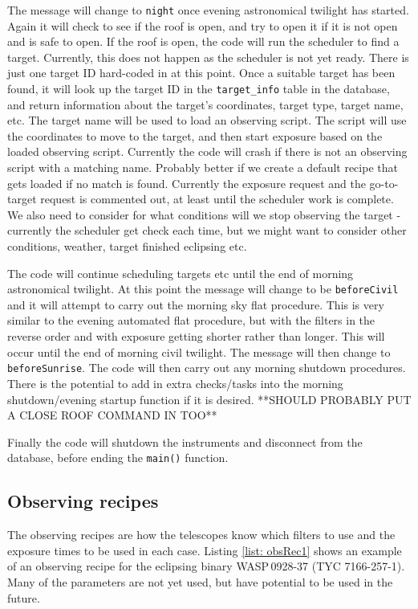 \documentclass[a4paper,12pt]{article}
\begin{document}
The message will change to {\tt night} once evening astronomical twilight has started. Again it will check to see if the roof is open, and try to open it if it is not open and is safe to open. If the roof is open, the code will run the scheduler to find a target. {\color{blue} Currently, this does not happen as the scheduler is not yet ready. There is just one target ID hard-coded in at this point.} Once a suitable target has been found, it will look up the target ID in the {\tt target\_info} table in the database, and return information about the target's coordinates, target type, target name, etc. The target name will be used to load an observing script. The script will use the coordinates to move to the target, and then start exposure based on the loaded observing script. {\color{blue} Currently the code will crash if there is not an observing script with a matching name. Probably better if we create a default recipe that gets loaded if no match is found.} Currently the exposure request and the go-to-target request is commented out, at least until the scheduler work is complete. {\color{blue} We also need to consider for what conditions will we stop observing the target - currently the scheduler get check each time, but we might want to consider other conditions, weather, target finished eclipsing etc.} 

The code will continue scheduling targets etc until the end of morning astronomical twilight. At this point the message will change to be {\tt beforeCivil} and it will attempt to carry out the morning sky flat procedure. This is very similar to the evening automated flat procedure, but with the filters in the reverse order and with exposure getting shorter rather than longer. This will occur until the end of morning civil twilight. The message will then change to {\tt beforeSunrise}. The code will then carry out any morning shutdown procedures. {\color{blue} There is the potential to add in extra checks/tasks into the morning shutdown/evening startup function if it is desired. **SHOULD PROBABLY PUT A CLOSE ROOF COMMAND IN TOO**}

Finally the code will shutdown the instruments and disconnect from the database, before ending the {\tt main()} function.

\subsection{Observing recipes}
\label{subsec:obsRecipes}

The observing recipes are how the telescopes know which filters to use and the exposure times to be used in each case. Listing \ref{list: obsRec1} shows an example of an observing recipe for the eclipsing binary WASP\,0928-37 (TYC 7166-257-1). Many of the parameters are not yet used, but have potential to be used in the future.
\end{document}

